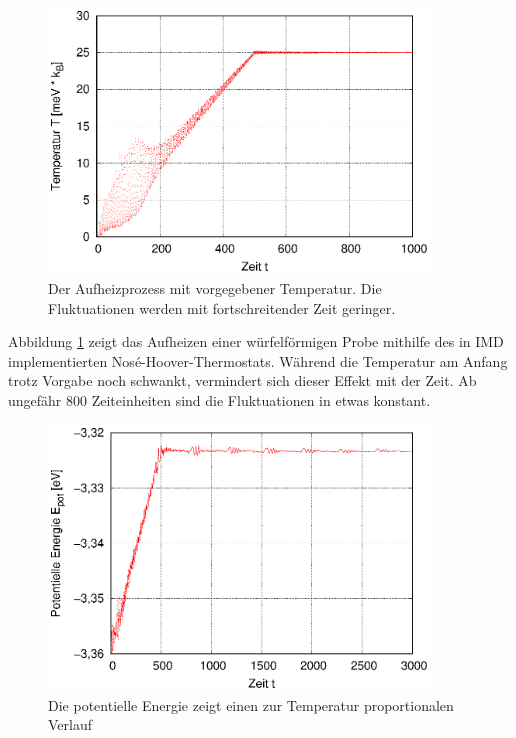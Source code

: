 		\begin{figure}[!ht]
			\centering
			\includegraphics[width=0.9\textwidth]{chapter/main/single/plt/equilibration/thermostat.eps}
			\caption{Der Aufheizprozess mit vorgegebener Temperatur. Die Fluktuationen werden
			mit fortschreitender Zeit geringer.}
			\label{fig:thermostat}
		\end{figure}

		Abbildung \ref{fig:thermostat} zeigt das Aufheizen einer würfelförmigen Probe mithilfe des
		in IMD implementierten Nosé-Hoover-Thermostats. Während die Temperatur am Anfang trotz
		Vorgabe noch schwankt, vermindert sich dieser Effekt mit der Zeit. Ab ungefähr 800
		Zeiteinheiten sind die Fluktuationen in etwas konstant.

		\begin{figure}[!ht]
			\centering
			\includegraphics[width=0.9\textwidth]{chapter/main/single/plt/equilibration/thermostat_pot.eps}
			\caption{Die potentielle Energie zeigt einen zur Temperatur proportionalen Verlauf}
			\label{fig:thermostat_pot}
		\end{figure}

